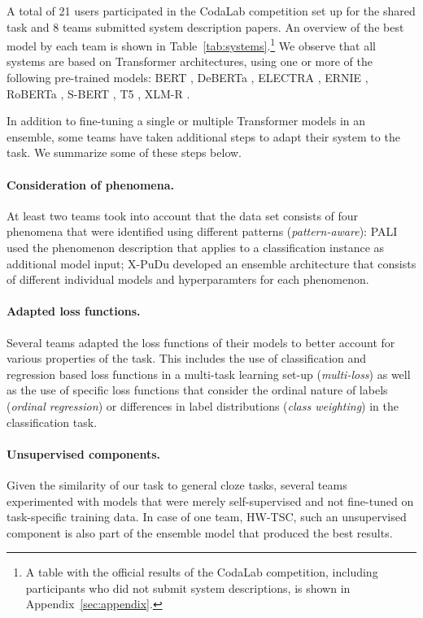 \documentclass[11pt]{article}
\begin{document}
A total of 21 users participated in the CodaLab competition set up for the shared task and 8 teams submitted system description papers. An overview of the best model by each team is shown in Table~\ref{tab:systems}.\footnote{A table with the official results of the CodaLab competition, including participants who did not submit system descriptions, is shown in Appendix~\ref{sec:appendix}.} We observe that all systems are based on Transformer architectures, using one or more of the following pre-trained models: BERT \cite{devlin-etal-2019-bert}, DeBERTa \cite{he:2020:deberta}, ELECTRA \cite{clark:2019:electra}, ERNIE \cite{sun:2019:ernie}, RoBERTa \cite{liu:2019:roberta}, S-BERT \cite{reimers-gurevych-2019-sentence}, T5 \cite{raffel:2020:t5}, XLM-R \cite{conneau-etal-2020-unsupervised}. 

In addition to fine-tuning a single or multiple Transformer models in an ensemble, some teams have taken additional steps to adapt their system to the task. We summarize some of these steps below.

\paragraph{Consideration of phenomena.} At least two teams took into account that the data set consists of four phenomena that were identified using different patterns (\textit{pattern-aware}): PALI used the phenomenon description that applies to a classification instance as additional model input; X-PuDu developed an ensemble architecture that consists of different individual models and hyperparamters for each phenomenon.

\paragraph{Adapted loss functions.} Several teams adapted the loss functions of their models to better account for various properties of the task. This includes the use of classification and regression based loss functions in a multi-task learning set-up (\textit{multi-loss}) as well as the use of specific loss functions that consider the ordinal nature of labels (\textit{ordinal regression}) or differences in label distributions (\textit{class weighting}) in the classification task.

\paragraph{Unsupervised components.} Given the similarity of our task to general cloze tasks, several teams experimented with models that were merely self-supervised and not fine-tuned on task-specific training data. In case of one team, HW-TSC, such an unsupervised component is also part of the ensemble model that produced the best results.
\end{document}

